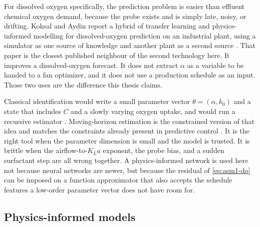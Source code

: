 For dissolved oxygen specifically, the prediction problem is easier than effluent chemical oxygen demand, because the probe exists and is simply late, noisy, or drifting. Koksal and Aydin report a hybrid of transfer learning and physics-informed modelling for dissolved-oxygen prediction on an industrial plant, using a simulator as one source of knowledge and another plant as a second source \cite{koksal2024,pan2010transfer}. That paper is the closest published neighbour of the second technology here. It improves a dissolved-oxygen forecast. It does not extract $\alpha$ as a variable to be handed to a fan optimizer, and it does not use a production schedule as an input. Those two uses are the difference this thesis claims.

Classical identification would write a small parameter vector $\theta=(\alpha,k_{0})$ and a state that includes $C$ and a slowly varying oxygen uptake, and would run a recursive estimator \cite{ljung1999,kalman1960,rao2003mhe}. Moving-horizon estimation is the constrained version of that idea and matches the constraints already present in predictive control \cite{rao2003mhe,rawlings2017mpc}. It is the right tool when the parameter dimension is small and the model is trusted. It is brittle when the airflow-to-$K_La$ exponent, the probe bias, and a sudden surfactant step are all wrong together. A physics-informed network is used here not because neural networks are newer, but because the residual of \eqref{eq:asm1-do} can be imposed on a function approximator that also accepts the schedule features a low-order parameter vector does not have room for.

\subsection{Physics-informed models}

